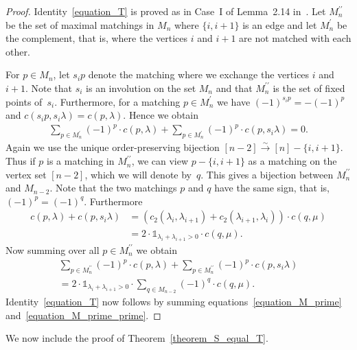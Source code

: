 \documentclass[10pt]{amsart}
\theoremstyle{definition}
\newcommand{\fl}{\rightarrow}
\newcommand{\ungras}{\mathds{1}}
\newcommand{\iso}{\stackrel{\sim}{\fl}}
\begin{document}
\begin{proof}
Identity~\eqref{equation_T} 
is proved as in Case~I of Lemma~2.14 in~\cite{Herb}.
Let $M_{n}^{\prime\prime}$ be the set
of maximal matchings in $M_{n}$ where
$\{i,i+1\}$ is an edge and
let $M_{n}^{\prime}$ be the complement,
that is, where the vertices $i$ and $i+1$ are not matched with each other.

For $p \in M_{n}$, let $s_{i}p$ denote the
matching where we exchange the vertices $i$ and~$i+1$.
Note that $s_{i}$ is an involution on the
set $M_{n}$
and that $M_{n}^{\prime\prime}$ is the set of fixed points
of~$s_{i}$.
Furthermore, for a matching $p \in M_{n}^{\prime}$
we have
$(-1)^{s_{i} p} = - (-1)^{p}$
and
$c(s_{i}p, s_{i} \lambda) = c(p, \lambda)$.
Hence we obtain
\begin{align}
\sum_{p \in M_{n}^{\prime}} (-1)^{p} \cdot c(p, \lambda)
+
\sum_{p \in M_{n}^{\prime}} (-1)^{p} \cdot c(p, s_{i} \lambda)
= 0 .
\label{equation_M_prime}
\end{align}
Again we use
the unique order-preserving bijection $[n-2] \iso [n] - \{i,i+1\}$.
Thus if $p$ is a matching in $M_{n}^{\prime\prime}$, we can view
$p-\{i,i+1\}$ as a matching
on the vertex set $[n-2]$, which we will denote by~$q$.
This gives a bijection between
$M_{n}^{\prime\prime}$
and $M_{n-2}$.
Note that the two matchings $p$ and $q$ have the same sign,
that is, $(-1)^{p} = (-1)^{q}$.
Furthermore
\begin{align*}
c(p,\lambda) + c(p,s_{i}\lambda) 
& =
(c_{2}(\lambda_{i},\lambda_{i+1}) + c_{2}(\lambda_{i+1},\lambda_{i}))
\cdot
c(q,\mu) \\
& =
2 \cdot \ungras_{\lambda_{i}+\lambda_{i+1} > 0}
\cdot
c(q,\mu) .
\end{align*}
Now summing over all $p \in M_{n}^{\prime\prime}$
we obtain
\begin{multline}
\label{equation_M_prime_prime}
\sum_{p \in M_{n}^{\prime\prime}}
(-1)^{p} \cdot c(p, \lambda)
+
\sum_{p \in M_{n}^{\prime\prime}}
(-1)^{p} \cdot c(p, s_{i} \lambda)
\\ = 
2 \cdot \ungras_{\lambda_{i}+\lambda_{i+1} > 0} 
\cdot
\sum_{q \in M_{n-2}} (-1)^{q} \cdot c(q, \mu) .
\end{multline}
Identity~\eqref{equation_T} 
now follows by summing equations~\eqref{equation_M_prime}
and~\eqref{equation_M_prime_prime}.
\end{proof}


We now include the proof of Theorem~\ref{theorem_S_equal_T}. 
\end{document}
